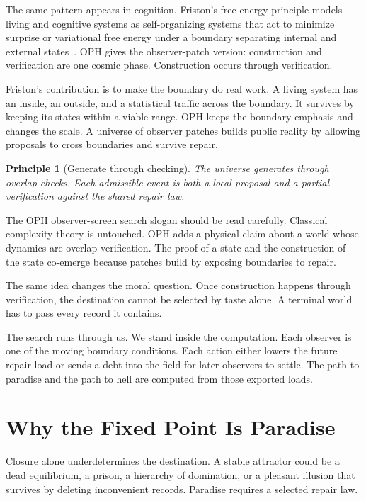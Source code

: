 \documentclass[11pt]{article}
\newtheorem{principle}[definition]{Principle}
\theoremstyle{remark}
\theoremstyle{plain}
\begin{document}
The same pattern appears in cognition. Friston's free-energy principle models
living and cognitive systems as self-organizing systems that act to minimize
surprise or variational free energy under a boundary separating internal and
external states~\cite{Friston2010,Friston2019}. OPH gives the observer-patch
version: construction and verification are one cosmic phase. Construction
occurs through verification.

Friston's contribution is to make the boundary do real work. A living system has
an inside, an outside, and a statistical traffic across the boundary. It survives
by keeping its states within a viable range. OPH keeps the boundary emphasis and
changes the scale. A universe of observer patches builds public reality by
allowing proposals to cross boundaries and survive repair.

\begin{principle}[Generate through checking]
The universe generates through overlap checks. Each admissible event is both a local
proposal and a partial verification against the shared repair law.
\end{principle}

The OPH observer-screen search slogan should be read carefully.
Classical complexity theory is untouched. OPH adds a physical claim about a
world whose dynamics are overlap verification. The proof of a state and the
construction of the state co-emerge because patches build by exposing
boundaries to repair.

The same idea changes the moral question. Once construction happens through
verification, the destination cannot be selected by taste alone. A terminal
world has to pass every record it contains.

The search runs through us. We stand inside the computation. Each
observer is one of the moving boundary conditions. Each action either lowers
the future repair load or sends a debt into the field for later observers to
settle. The path to paradise and the path to hell are computed from those
exported loads.

\section{Why the Fixed Point Is Paradise}

Closure alone underdetermines the destination. A stable attractor could be a
dead equilibrium, a prison, a hierarchy of domination, or a pleasant illusion
that survives by deleting inconvenient records. Paradise requires a selected
repair law.
\end{document}
